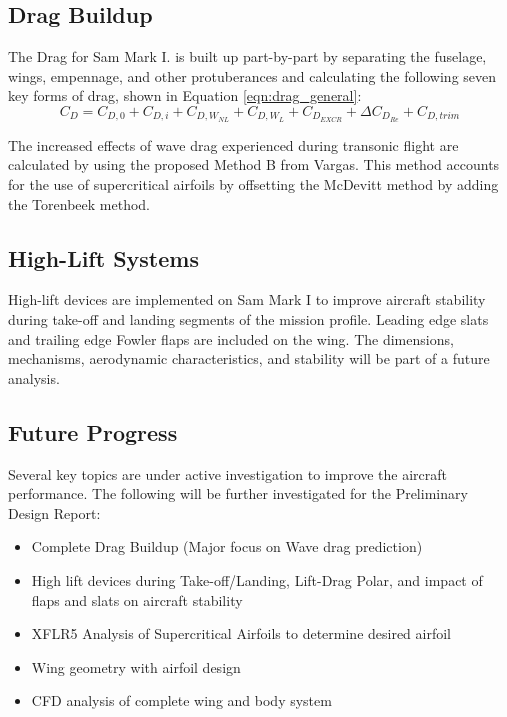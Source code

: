 \subsection{Drag Buildup}
The Drag for Sam Mark I. is built up part-by-part by separating the fuselage, wings, empennage, and other protuberances and calculating the following seven key forms of drag, shown in Equation \ref{eqn:drag_general}:
\begin{equation}\label{eqn:drag_general}
    C_D = C_{D,0} + C_{D,i} + C_{D,W_{NL}} + C_{D,W_{L}} + C_{D_{EXCR}} + \Delta C_{D_{Re}} + C_{D,trim}
\end{equation}

The increased effects of wave drag experienced during transonic flight are calculated by using the proposed Method B from Vargas.  This method accounts for the use of supercritical airfoils by offsetting the McDevitt method by adding the Torenbeek method.


\subsection{High-Lift Systems}
High-lift devices are implemented on Sam Mark I to improve aircraft stability during take-off and landing segments of the mission profile.  Leading edge slats and trailing edge Fowler flaps are included on the wing.  The dimensions, mechanisms, aerodynamic characteristics, and stability will be part of a future analysis.

\subsection{Future Progress}
Several key topics are under active investigation to improve the aircraft performance. The following will be further investigated for the Preliminary Design Report:
\begin{itemize}
    \item Complete Drag Buildup (Major focus on Wave drag prediction)
    \item High lift devices during Take-off/Landing, Lift-Drag Polar, and impact of flaps and slats on aircraft stability
    \item XFLR5 Analysis of Supercritical Airfoils to determine desired airfoil
    \item Wing geometry with airfoil design
    \item CFD analysis of complete wing and body system
\end{itemize}


